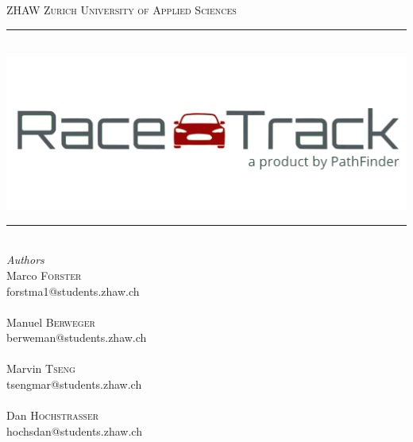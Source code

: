 \begin{titlepage} %
	\newcommand{\HRule}{\rule{\linewidth}{0.2mm}} %
	
	\center %
	
	\textsc{\LARGE ZHAW Zurich University of Applied Sciences}\\[1.5cm] %
	
	\HRule\\[0.6cm]
	\includegraphics[scale=0.4]{img/RaceTrack_Logo.png}
	\HRule\\[1.5cm]
	
	{\large\textit{Authors}}\\[0.6cm]
	Marco \textsc{Forster}\\ %
	forstma1@students.zhaw.ch\\~\\
	Manuel \textsc{Berweger}\\ %
	berweman@students.zhaw.ch\\~\\
	Marvin \textsc{Tseng}\\ %
	tsengmar@students.zhaw.ch\\~\\
	Dan \textsc{Hochstrasser}\\ %
	hochsdan@students.zhaw.ch\\~\\
	

\end{titlepage}

